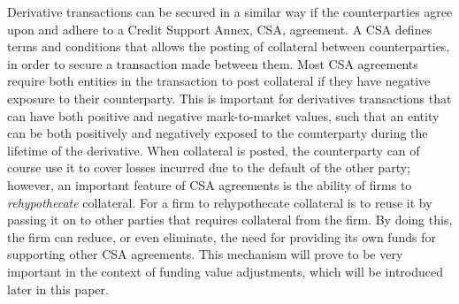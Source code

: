 \documentclass[main.tex]{subfiles}
\begin{document}
        Derivative transactions can be secured in a similar way 
        if the counterparties agree upon and adhere to a Credit Support Annex, CSA, agreement.
        A CSA defines terms and conditions that allows the posting of collateral between counterparties, 
        in order to secure a transaction made between them.
        Most CSA agreements require both entities in the transaction to post collateral 
        if they have negative exposure to their counterparty. 
        This is important for derivatives transactions that can have both 
        positive and negative mark-to-market values, 
        such that an entity can be both positively and negatively exposed to the counterparty
        during the lifetime of the derivative.
        When collateral is posted, the counterparty can of course use it to cover losses incurred 
        due to the default of the other party;
        however, an important feature of CSA agreements is the ability of firms to
        \textit{rehypothecate} collateral.
        For a firm to rehypothecate collateral is to reuse it by passing it on to other parties that 
        requires collateral from the firm.
        By doing this, the firm can reduce, or even eliminate, the need for providing its own funds
        for supporting other CSA agreements. 
        This mechanism will prove to be very important in the context of funding value adjustments,
        which will be introduced later in this paper.
\end{document}
